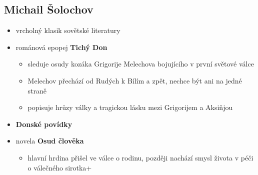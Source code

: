 \subsection{Michail Šolochov}
\begin{itemize}
\item vrcholný klasik sovětské literatury
\item románová epopej \textbf{Tichý Don}
	\begin{itemize}
	\item sleduje osudy kozáka Grigorije Melechova bojujícího v první světové válce
	\item Melechov přechází od Rudých k Bílím a zpět, nechce být ani na jedné straně
	\item popisuje hrůzy války a tragickou lásku mezi Grigorijem a Aksiňjou
	\end{itemize}
\item \textbf{Donské povídky}
\item novela \textbf{Osud člověka}
	\begin{itemize}
	\item hlavní hrdina přišel ve válce o rodinu, později nachází smysl života v péči o válečného sirotka+
	\end{itemize}
\end{itemize}

